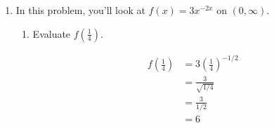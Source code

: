 \documentclass{article}
\begin{document}
\begin{enumerate}




\item \label{log-diff-curve-sketch-2} 

  In this problem, you'll look at $f(x) = 3x^{-2x}$ on $(0, \infty)$.

  \begin{enumerate}

  \item
    \begin{problem}[1in]
      Evaluate $f( \frac{1}{4})$.
    \end{problem}

    \begin{solution}
      \begin{align*}
        f (\tfrac{1}{4}) &= 3( \tfrac{1}{4}
        )^{-1/2} \\
        &= \frac{3}{\sqrt{1/4}} \\
        &= \frac{3}{1 / 2} \\
        &= \boxed{6}
      \end{align*}
    \end{solution}


\end{enumerate}
\end{enumerate}
\end{document}
